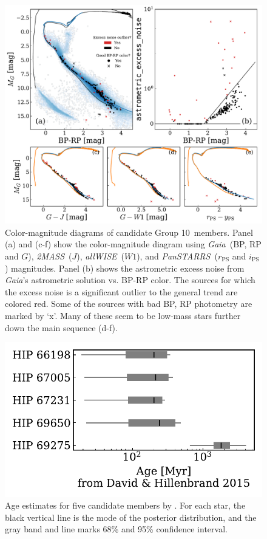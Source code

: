\documentclass[modern,letterpaper]{aastex61}
\newcommand{\project}[1]{\textsl{#1}}
\newcommand{\acronym}[1]{{\small{#1}}}
\newcommand{\gaia}{\project{Gaia}}
\newcommand{\tmass}{\project{\acronym{2MASS}}}
\newcommand{\allwise}{\project{\acronym{allWISE}}}
\newcommand{\panstarrs}{\project{\acronym{PanSTARRS}}}
\newcommand{\groupTen}{Group 10}
\begin{document}
\begin{figure}
  \includegraphics[width=0.95\linewidth]{bp_rp_G.pdf}
  \caption{
    Color-magnitude diagrams of candidate \groupTen\ members.
    Panel (a) and (c-f) show the color-magnitude diagram using \gaia\ (BP, RP and $G$),
    \tmass\ ($J$), \allwise\ ($W1$), and \panstarrs\ ($r_\mathrm{PS}$ and $i_\mathrm{PS}$)
    magnitudes. Panel (b) shows the astrometric excess noise from \gaia's astrometric
    solution vs. BP-RP color. The sources for which the excess noise is a significant
    outlier to the general trend are colored red.
    Some of the sources with bad BP, RP photometry are marked by `x'.
    Many of these seem to be low-mass stars further down the main sequence (d-f).
  }
  \label{fig:cmd}
\end{figure}

\begin{figure}
  \centering
  \includegraphics{age_DavidHillenbrand2015.pdf}
  \caption{Age estimates for five candidate members by \citet{2015ApJ...804..146D}.
    For each star, the black vertical line is the mode of the posterior
    distribution, and the gray band and line marks 68\% and 95\% confidence
    interval.
  }
  \label{fig:age_DavidHillenbrand2015}
\end{figure}
\end{document}
